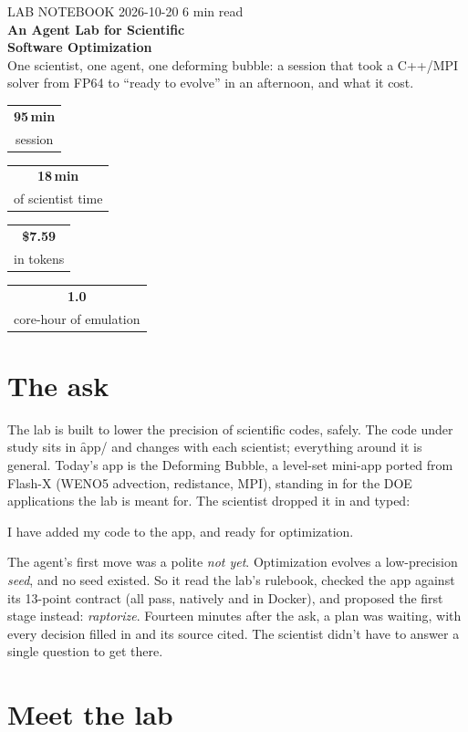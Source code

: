 \documentclass{../style}
\makeatletter
\newcommand{\stat}[2]{\begin{tabular}[t]{@{}c@{}}{\huge\bfseries\color{accent}#1}\\[2pt]{\small\color{muted}#2}\end{tabular}}
\newcommand{\wall}{95}\newcommand{\human}{18}\newcommand{\agent}{49}\newcommand{\usd}{7.59}
\makeatother
\begin{document}
{\small\color{muted}LAB NOTEBOOK \textbullet{} 2026-10-20 \textbullet{} 6 min read}\\[4pt]
{\fontsize{26}{30}\selectfont\bfseries\color{ink} An Agent Lab for Scientific\\ Software Optimization}\\[6pt]
{\large\color{muted} One scientist, one agent, one deforming bubble: a session that took a
C++/MPI solver from FP64 to ``ready to evolve'' in an afternoon, and what it cost.}

\vspace{0.8em}
\begin{panel}
\centering
\stat{\wall\,min}{session} \hfill \stat{\human\,min}{of scientist time} \hfill
\stat{\$\usd}{in tokens} \hfill \stat{1.0}{core-hour of emulation}
\end{panel}

\section{The ask}

The lab is built to lower the precision of scientific codes, safely. The code under study sits in
\f{app/} and changes with each scientist; everything around it is general. Today's app is the
Deforming Bubble, a level-set mini-app ported from Flash-X (WENO5 advection, redistance, MPI),
standing in for the DOE applications the lab is meant for. The scientist dropped it in and typed:

\begin{quoteit}
I have added my code to the app, and ready for optimization.
\end{quoteit}

The agent's first move was a polite \emph{not yet}. Optimization evolves a low-precision
\emph{seed}, and no seed existed. So it read the lab's rulebook, checked the app against its
13-point contract (all pass, natively and in Docker), and proposed the first stage instead:
\emph{raptorize}. Fourteen minutes after the ask, a plan was waiting, with every decision
filled in and its source cited. The scientist didn't have to answer a single question
to get there.

\section{Meet the lab}
\end{document}
